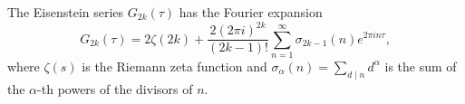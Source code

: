 The Eisenstein series $G_{2k}(\tau)$ has the Fourier expansion
$$G_{2k}(\tau) = 2\zeta(2k) + \frac{2(2\pi i)^{2k}}{(2k-1)!} \sum_{n=1}^{\infty} \sigma_{2k-1}(n) e^{2\pi i n \tau},$$
where $\zeta(s)$ is the Riemann zeta function and $\sigma_{\alpha}(n) = \sum_{d \mid n} d^{\alpha}$ is the sum of the $\alpha$-th powers of the divisors of $n$.
